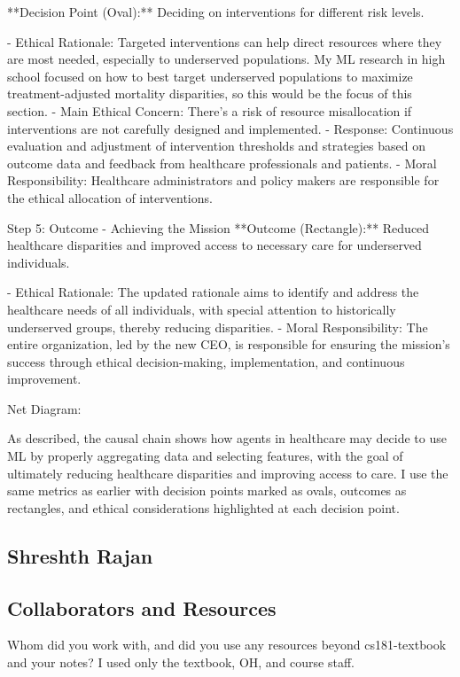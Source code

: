 \documentclass[submit]{harvardml}
\begin{document}
**Decision Point (Oval):** Deciding on interventions for different risk levels.

- Ethical Rationale: Targeted interventions can help direct resources where they are most needed, especially to underserved populations. My ML research in high school focused on how to best target underserved populations to maximize treatment-adjusted mortality disparities, so this would be the focus of this section. 
- Main Ethical Concern: There's a risk of resource misallocation if interventions are not carefully designed and implemented.
- Response: Continuous evaluation and adjustment of intervention thresholds and strategies based on outcome data and feedback from healthcare professionals and patients.
- Moral Responsibility: Healthcare administrators and policy makers are responsible for the ethical allocation of interventions.
\newline

Step 5: Outcome - Achieving the Mission
**Outcome (Rectangle):** Reduced healthcare disparities and improved access to necessary care for underserved individuals.

- Ethical Rationale: The updated rationale aims to identify and address the healthcare needs of all individuals, with special attention to historically underserved groups, thereby reducing disparities.
- Moral Responsibility: The entire organization, led by the new CEO, is responsible for ensuring the mission's success through ethical decision-making, implementation, and continuous improvement.
\newline

Net Diagram: 

As described, the causal chain shows how agents in healthcare may decide to use ML by properly aggregating data and selecting features, with the goal of ultimately reducing healthcare disparities and improving access to care. I use the same metrics as earlier with decision points marked as ovals, outcomes as rectangles, and ethical considerations highlighted at each decision point.

\newpage
\subsection*{Shreshth Rajan}

\subsection*{Collaborators and Resources}
Whom did you work with, and did you use any resources beyond cs181-textbook and your notes? I used only the textbook, OH, and course staff. 
\end{document}
